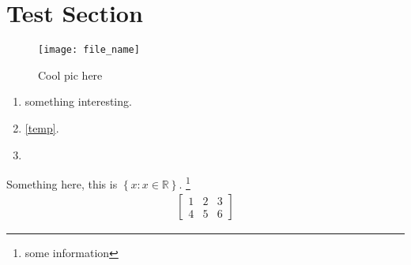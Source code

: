 \documentclass[10pt]{article} %
\makeatletter
\let\footnote\thanks%
	{\LARGE\@title\par}%
\makeatother
\begin{document}
 

\section*{Test Section}

\begin{figure}[!th]
	\centering
	\texttt{[image: file\_name]}
	\caption{Cool pic here}
	\label{fig_cool}
\end{figure}

\begin{enumerate}[label = \arabic*.]
	\item something interesting.
	\item \ref{temp}.
	\item \cite[hahahahah]{chen2020} \label{thiis}
\end{enumerate}

\begin{definition}
	Something here, this is $\left\{x:x\in\mathbb{R}\right\}$.
	\footnote{some information}
	\begin{align}\label{temp}
		\begin{bmatrix}
			1 & 2 & 3 \\
			4 & 5 & 6
		\end{bmatrix}
		\tag{equation}
	\end{align}
\end{definition}

\end{document}
